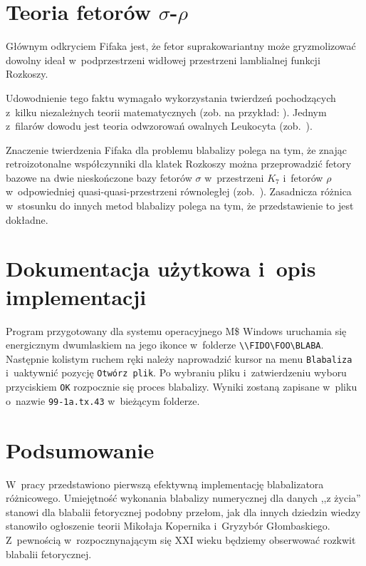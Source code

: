 \documentclass[licencjacka]{pracamgr}
\begin{document}
\chapter{Teoria fetorów $\sigma$-$\rho$}\label{r:fifak}

Głównym odkryciem Fifaka jest, że fetor suprakowariantny może
gryzmolizować dowolny ideał w~podprzestrzeni widłowej przestrzeni
lamblialnej funkcji Rozkoszy.

Udowodnienie tego faktu wymagało wykorzystania twierdzeń pochodzących
z~kilku niezależnych teorii matematycznych (zob. na przykład:
\cite{russell,spyrpt,JR,beaman,hopp,srinis}).  Jednym z~filarów
dowodu jest teoria odwzorowań owalnych Leukocyta (zob.~\cite{leuk}).

Znaczenie twierdzenia Fifaka dla problemu blabalizy polega na tym, że
znając retroizotonalne współczynniki dla klatek Rozkoszy można
przeprowadzić fetory bazowe na dwie nieskończone bazy fetorów $\sigma$
w~przestrzeni $K_7$ i~fetorów $\rho$ w~odpowiedniej
quasi-quasi-przestrzeni równoległej (zob.~\cite{hopp}).  Zasadnicza
różnica w~stosunku do innych metod blabalizy polega na tym, że
przedstawienie to jest dokładne.

\chapter{Dokumentacja użytkowa i~opis implementacji}\label{r:impl}

Program przygotowany dla systemu operacyjnego M\$ Windows uruchamia
się energicznym dwumlaskiem na jego ikonce w~folderze
\verb+\\FIDO\FOO\BLABA+.  Następnie kolistym ruchem ręki należy
naprowadzić kursor na menu \texttt{Blabaliza} i~uaktywnić pozycję
\texttt{Otwórz plik}.  Po wybraniu pliku i~zatwierdzeniu wyboru
przyciskiem \texttt{OK} rozpocznie się proces blabalizy.  Wyniki
zostaną zapisane w~pliku o~nazwie \texttt{99-1a.tx.43} w~bieżącym
folderze.

\chapter{Podsumowanie}

W~pracy przedstawiono pierwszą efektywną implementację blabalizatora
różnicowego.  Umiejętność wykonania blabalizy numerycznej dla danych
,,z życia'' stanowi dla blabalii fetorycznej podobny przełom, jak dla
innych dziedzin wiedzy stanowiło ogłoszenie teorii Mikołaja Kopernika
i~Gryzybór Głombaskiego.  Z~pewnością w~rozpocznynającym się XXI wieku
będziemy obserwować rozkwit blabalii fetorycznej.
\end{document}
